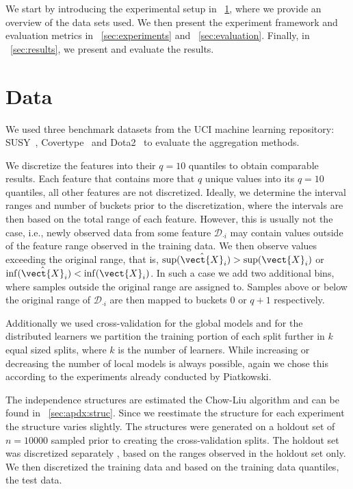 We start by introducing  the experimental setup in  \sect~\ref{sec:setup}, where we provide an overview of the data sets used.
We then present the experiment framework and evaluation metrics in \sect~\ref{sec:experiments} and \sect~\ref{sec:evaluation}.
Finally, in \sect~\ref{sec:results}, we present and evaluate the results.

\section{Data}
\label{sec:setup}

We used three benchmark datasets from the UCI machine learning repository: SUSY~\cite{baldi2014searching}, Covertype~\cite{blackard2000comparison} and Dota2~\cite{tridgell2016dota2} to evaluate the aggregation methods.


We discretize the features into their $q=10$ quantiles to obtain comparable results.
Each feature that contains more that $q$ unique values into its $q=10$ quantiles, all other features are not discretized.
Ideally, we determine the interval ranges and number of buckets prior to the discretization, where the intervals are then based on the total range of each feature.
However, this is usually not the case, i.e., newly observed data from some feature $\mathcal{D}_{\cdot i}$ may contain values outside of the feature range observed in the training data. 
We then observe values exceeding the original range, that is, $\sup(\hat{\vect{X}}_i) > \sup(\vect{X}_i) $ or  $\inf(\hat{\vect{X}}_i) < \inf(\vect{X}_i) $.
In such a case we add two additional bins, where samples outside the original range are assigned to.
Samples above or below the original range of $\mathcal{D}_{\cdot i}$ are then  mapped to buckets $0$ or $q+1$ respectively.

Additionally we used cross-validation for the global models and for the distributed learners we partition the training portion of each split further in $k$ equal sized splits, where $k$ is the number of learners.
While increasing or decreasing the number of local models is always possible, again we chose this according to the experiments already conducted by Piatkowski.

The independence structures are estimated the Chow-Liu algorithm and can be found in \sect~\ref{sec:apdx:struc}.
Since we reestimate the structure for each experiment the structure varies slightly.
The structures were generated on a holdout set of $n=10000$ sampled prior to creating the cross-validation splits.
The holdout set was discretized separately , based on the ranges observed in the holdout set only.
We then discretized the training data and based on the training data quantiles, the test data.

